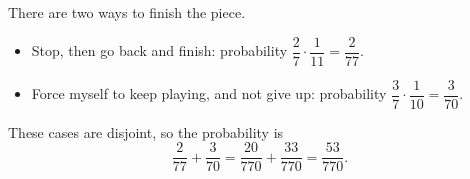 There are two ways to finish the piece.
\begin{itemize}
\item Stop, then go back and finish: probability $\dfrac27\cdot\dfrac{1}{11}=\dfrac{2}{77}$.
\item Force myself to keep playing, and not give up: probability $\dfrac37\cdot\dfrac{1}{10}=\dfrac{3}{70}$.
\end{itemize}
These cases are disjoint, so the probability is
\[\dfrac{2}{77}+\dfrac{3}{70}=\dfrac{20}{770}+\dfrac{33}{770}=\boxed{\dfrac{53}{770}}.\]
